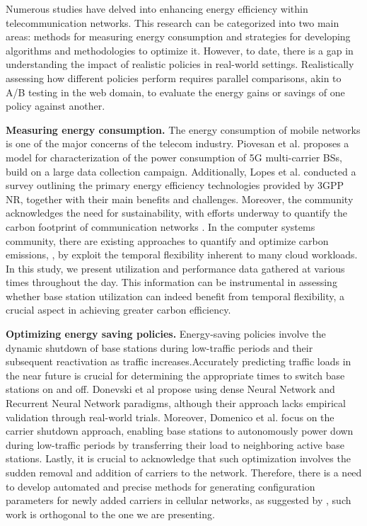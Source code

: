 Numerous studies have delved into enhancing energy efficiency within telecommunication networks. This research can be categorized into two main areas: methods for measuring energy consumption and strategies for developing algorithms and methodologies to optimize it. However, to date, there is a gap in understanding the impact of realistic policies in real-world settings. Realistically assessing how different policies perform requires parallel comparisons, akin to A/B testing in the web domain, to evaluate the energy gains or savings of one policy against another.

\textbf{Measuring energy consumption.} The energy consumption of mobile networks is one of the major concerns of the telecom industry. Piovesan et al. \cite{Piovesan2022} proposes a model for characterization of the power consumption of 5G multi-carrier BSs, build on a large data collection campaign. Additionally, Lopes et al. \cite{survey_5g_energy_efficiency} conducted a survey outlining the primary energy efficiency technologies provided by 3GPP NR, together with their main benefits and challenges. Moreover, the community acknowledges the need for sustainability, with efforts underway to quantify the carbon footprint of communication networks \cite{IEA2024}. In the computer systems community, there are existing approaches to quantify and optimize carbon emissions, \cite{CarbonScaler}, by exploit the temporal flexibility inherent to many cloud workloads. In this study, we present utilization and performance data gathered at various times throughout the day. This information can be instrumental in assessing whether base station utilization can indeed benefit from temporal flexibility, a crucial aspect in achieving greater carbon efficiency.

\textbf{Optimizing energy saving policies.} Energy-saving policies involve the dynamic shutdown of base stations during low-traffic periods and their subsequent reactivation as traffic increases.Accurately predicting traffic loads in the near future is crucial for determining the appropriate times to switch base stations on and off. Donevski et al \cite{Donevski2019} propose using dense Neural Network and Recurrent Neural Network paradigms, although their approach lacks empirical validation through real-world trials. Moreover, Domenico et al. \cite{user_transfer_5g} focus on the carrier shutdown approach, enabling base stations to autonomously power down during low-traffic periods by transferring their load to neighboring active base stations. Lastly, it is crucial to acknowledge that such optimization involves the sudden removal and addition of carriers to the network. Therefore, there is a need to develop automated and precise methods for generating configuration parameters for newly added carriers in cellular networks, as suggested by \cite{Mahimkar2021}, such work is orthogonal to the one we are presenting.